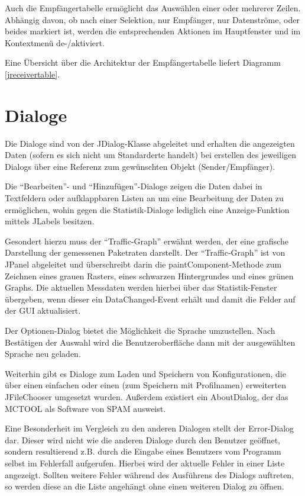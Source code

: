         Auch die Empfängertabelle ermöglicht das Auswählen einer oder mehrerer
        Zeilen. Abhängig davon, ob nach einer Selektion, nur Empfänger, nur
        Datenströme, oder beides markiert ist, werden die entsprechenden
        Aktionen im Hauptfenster und im Kontextmenü de-/aktiviert.
        
        Eine Übersicht über die Architektur der Empfängertabelle liefert
        Diagramm \ref{jreceivertable}.
    
    \section{Dialoge}
    
    	Die Dialoge sind von der JDialog-Klasse abgeleitet und erhalten die
    	angezeigten Daten (sofern es sich nicht um Standarderte handelt) bei
    	erstellen des jeweiligen Dialogs über eine Referenz zum gewünschten Objekt
    	(Sender/Empfänger).
    	
    	Die "`Bearbeiten"'- und "`Hinzufügen"'-Dialoge zeigen die Daten dabei
    	in Textfeldern oder aufklappbaren Listen an um eine Bearbeitung der Daten
    	zu ermöglichen, wohin gegen die Statistik-Dialoge lediglich eine
    	Anzeige-Funktion mittels JLabels besitzen. 
    	
    	Gesondert hierzu muss der "`Traffic-Graph"' erwähnt werden, der eine
    	grafische Darstellung der gemessenen Paketraten darstellt.
    	Der "`Traffic-Graph"' ist von JPanel abgeleitet und überschreibt darin die
    	paintComponent-Methode zum Zeichnen eines grauen Rasters, eines schwarzen
    	Hintergrundes und eines grünen Graphs.
    	Die aktuellen Messdaten werden hierbei über das
    	Statistik-Fenster übergeben, wenn dieser ein DataChanged-Event erhält und
    	damit die Felder auf der GUI aktualisiert.
    	
    	Der Optionen-Dialog bietet die Möglichkeit die Sprache umzustellen. Nach
    	Bestätigen der Auswahl wird die Benutzeroberfläche dann mit der
    	ausgewählten Sprache neu geladen.
    	
    	Weiterhin gibt es Dialoge zum Laden und Speichern von Konfigurationen, die
    	über einen einfachen oder einen (zum Speichern mit Profilnamen) erweiterten
    	JFileChooser umgesetzt wurden. Außerdem existiert ein AboutDialog, der das
    	MCTOOL als Software von SPAM ausweist.
    	
    	Eine Besonderheit im Vergleich zu den anderen Dialogen stellt der
    	Error-Dialog dar. Dieser wird nicht wie die anderen Dialoge durch den
    	Benutzer geöffnet, sondern resultierend z.B. durch die Eingabe eines
    	Benutzers vom Programm selbst im Fehlerfall aufgerufen. Hierbei wird der
    	aktuelle Fehler in einer Liste angezeigt. Sollten weitere Fehler während
    	des Ausführens des Dialogs auftreten, so werden diese an die Liste
    	angehängt ohne einen weiteren Dialog zu öffnen.
    
